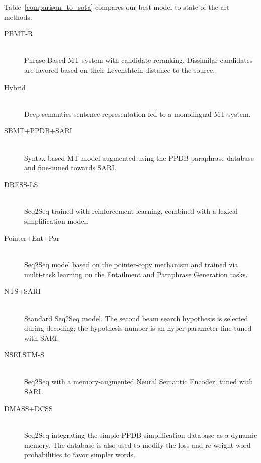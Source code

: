 \documentclass[10pt, a4paper]{article}
\begin{document}
Table~\ref{comparison_to_sota} compares our best model to state-of-the-art methods:
\begin{description}
  \item [PBMT-R] \cite{wubben2012sentence}\\
  Phrase-Based MT system with candidate reranking. Dissimilar candidates are favored based on their Levenshtein distance to the source. 
  \item [Hybrid] \cite{narayan2014hybrid}\\
  Deep semantics sentence representation fed to a monolingual MT system.
  \item [SBMT+PPDB+SARI] \cite{xu2016optimizing}\\ Syntax-based MT model augmented using the PPDB paraphrase database \cite{pavlick2015ppdb} and fine-tuned towards SARI. 
  \item [DRESS-LS] \cite{zhang2017sentence}\\
  Seq2Seq trained with reinforcement learning, combined with a lexical simplification model. 
  \item [Pointer+Ent+Par] \cite{guo2018dynamic}\\
  Seq2Seq model based on the pointer-copy mechanism and trained via multi-task learning on the Entailment and Paraphrase Generation tasks. 
  \item [NTS+SARI] \cite{nisioi2017exploring}\\
  Standard Seq2Seq model. The second beam search hypothesis is selected during decoding; the hypothesis number is an hyper-parameter fine-tuned with SARI. 
  \item [NSELSTM-S] \cite{vu2018sentence}\\
  Seq2Seq with a memory-augmented Neural Semantic Encoder, tuned with SARI. 
  \item [DMASS+DCSS] \cite{zhao2018integrating}\\
  Seq2Seq integrating the simple PPDB simplification database \cite{pavlick2016simple} as a dynamic memory. The database is also used to modify the loss and re-weight word probabilities to favor simpler words.
\end{description}
\end{document}
